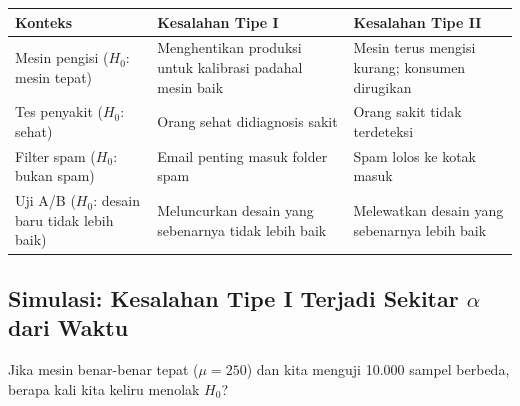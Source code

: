 \documentclass[
  indonesian,
  letterpaper,
]{book}
\newcounter{none} %
\begin{document}
{\def\LTcaptype{none} %
\begin{longtable}[]{@{}
  >{\raggedright\arraybackslash}p{}
  >{\raggedright\arraybackslash}p{}
  >{\raggedright\arraybackslash}p{}@{}}
\toprule\noalign{}
\begin{minipage}[b]{\linewidth}\raggedright
Konteks
\end{minipage} & \begin{minipage}[b]{\linewidth}\raggedright
Kesalahan Tipe I
\end{minipage} & \begin{minipage}[b]{\linewidth}\raggedright
Kesalahan Tipe II
\end{minipage} \\
\midrule\noalign{}
\endhead
\bottomrule\noalign{}
\endlastfoot
Mesin pengisi (\(H_0\): mesin tepat) & Menghentikan produksi untuk
kalibrasi padahal mesin baik & Mesin terus mengisi kurang; konsumen
dirugikan \\
Tes penyakit (\(H_0\): sehat) & Orang sehat didiagnosis sakit & Orang
sakit tidak terdeteksi \\
Filter spam (\(H_0\): bukan spam) & Email penting masuk folder spam &
Spam lolos ke kotak masuk \\
Uji A/B (\(H_0\): desain baru tidak lebih baik) & Meluncurkan desain
yang sebenarnya tidak lebih baik & Melewatkan desain yang sebenarnya
lebih baik \\
\end{longtable}
}

\subsection{\texorpdfstring{Simulasi: Kesalahan Tipe I Terjadi Sekitar
\(\alpha\) dari
Waktu}{Simulasi: Kesalahan Tipe I Terjadi Sekitar \textbackslash alpha dari Waktu}}\label{simulasi-kesalahan-tipe-i-terjadi-sekitar-alpha-dari-waktu}

Jika mesin benar-benar tepat (\(\mu = 250\)) dan kita menguji 10.000
sampel berbeda, berapa kali kita keliru menolak \(H_0\)?
\end{document}

